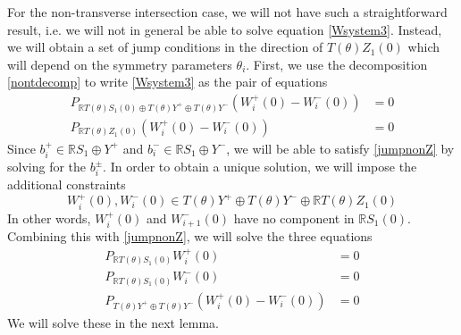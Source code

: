 \documentclass[12pt]{article}
\def\R{{\mathbb R}}
\begin{document}
For the non-transverse intersection case, we will not have such a straightforward result, i.e. we will not in general be able to solve equation \eqref{Wsystem3}. Instead, we will obtain a set of jump conditions in the direction of $T(\theta) Z_1(0)$ which will depend on the symmetry parameters $\theta_i$. First, we use the decomposition \eqref{nontdecomp} to write \eqref{Wsystem3} as the pair of equations
\begin{align}
P_{\R T(\theta)S_1(0) \oplus T(\theta)Y^+ \oplus T(\theta)Y^-}\left( W_i^+(0) - W_i^-(0) \right) &= 0 \label{jumpnonZ} \\
P_{\R T(\theta)Z_1(0)} \left( W_i^+(0) - W_i^-(0) \right) &= 0 \label{jumpZ}
\end{align}
Since $b_i^+ \in \R S_1 \oplus Y^+$ and $b_i^- \in \R S_1 \oplus Y^-$, we will be able to satisfy \eqref{jumpnonZ} by solving for the $b_i^\pm$. In order to obtain a unique solution, we will impose the additional constraints
\begin{equation}
W_i^+(0), W_i^-(0) \in T(\theta)Y^+ \oplus T(\theta)Y^- \oplus \R T(\theta) Z_1(0)
\end{equation}
In other words, $W_i^+(0)$ and $W_{i+1}^-(0)$ have no component in $\R S_1(0)$. Combining this with \eqref{jumpnonZ}, we will solve the three equations
\begin{equation}\label{nonadjjump1}
\begin{aligned}
P_{\R T(\theta) S_1(0) }W_i^+(0) &= 0 \\
P_{\R T(\theta) S_1(0) }W_i^-(0) &= 0 \\
P_{ T(\theta)Y^+ \oplus T(\theta)Y^-}\left( W_i^+(0) - W_i^-(0) \right) &= 0
\end{aligned}
\end{equation}
We will solve these in the next lemma.
\end{document}
